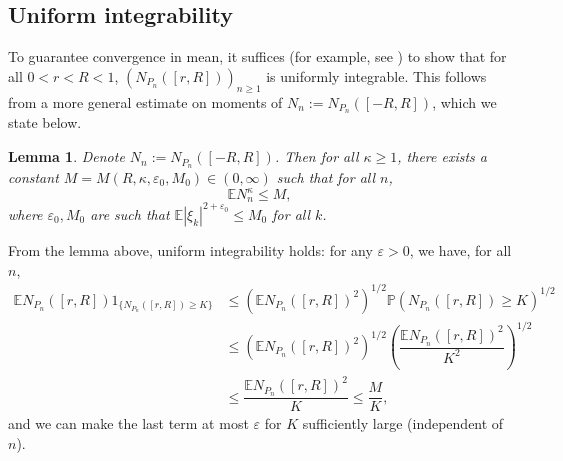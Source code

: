 \documentclass[12pt, reqno]{amsart}
\theoremstyle{plain}
\newtheorem{lemma}[theorem]{Lemma}
\theoremstyle{definition}
\renewcommand\P{{\mathbb{P}}}
\newcommand\E{{\mathbb{E}}}
\newcommand{\ep}{\varepsilon}
\begin{document}
\subsection{Uniform integrability}\label{sec:mean}
To guarantee convergence in mean, it suffices (for example, see \cite[Theorem 3.5]{billingsley99}) to show that for all $0 < r < R < 1$, $(N_{P_{n}}([r, R])) _{n \ge 1}$ is uniformly integrable. This follows from a more general estimate on moments of $N_n := N_{P_n}([-R, R])$, which we state below.
\begin{lemma}\label{lem:momentsOfNumRoots}
	Denote $N_n := N_{P_n}([-R, R])$. Then for all $\kappa \ge 1$, there exists a constant $M = M(R, \kappa, \varepsilon_0, M_0) \in (0,\infty)$ such that for all $n$, $$ \E N_n^{\kappa} \le M,$$
	where $\varepsilon_0, M_0$ are such that $\E|\xi_k|^{2 + \varepsilon_0} \le M_0$ for all $k$. 
\end{lemma}
From the lemma above, uniform integrability holds: for any $\ep > 0$, we have, for all $n$, 
\begin{align*}
	\E N_{P_{n}}([r, R]) 1_{\{N_{P_{n}}([r, R]) \ge K \}} &\le \left(\E N_{P_{n}}([r, R])^2\right)^{1/2} \P\left( N_{P_{n}}([r, R]) \ge K \right)^{1/2} \\
	&\le \left(\E N_{P_{n}}([r, R])^2\right)^{1/2} \left( \dfrac{\E N_{P_{n}}([r, R])^2}{K^2}\right)^{1/2} \\
	&\le \dfrac{\E N_{P_{n}}([r, R])^2}{K} \le \dfrac{M}{K},
\end{align*}
and we can make the last term at most $\ep$ for $K$ sufficiently large (independent of $n$).
\end{document}
